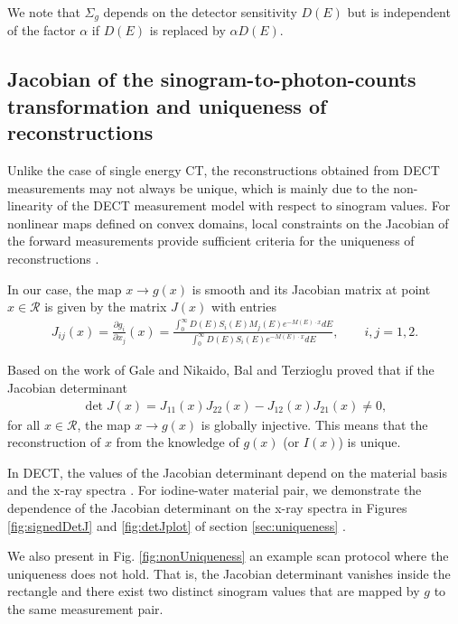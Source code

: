 \documentclass[12pt,twoside]{article}   %
\def\rR{\mathcal{R}}
\begin{document}
We note that $\Sigma_g$ depends on the detector sensitivity $D(E)$ but is independent of the factor $\alpha$ if $D(E)$ is replaced by $\alpha D(E)$.

\subsection{Jacobian of the sinogram-to-photon-counts transformation and uniqueness of reconstructions}\label{subsec:Jacobian}
 Unlike the case of single energy CT, the reconstructions obtained from DECT measurements may not always be unique, which is mainly due to the non-linearity of the DECT measurement model with respect to sinogram values. For nonlinear maps defined on convex domains, local constraints on the Jacobian of the forward measurements provide sufficient criteria for the uniqueness of reconstructions \cite{GaleNikaido, Garcia, MasColell}.
 
 In our case, the map $x\to g(x)$ is smooth and its Jacobian matrix at point $x\in \rR$ is given by the matrix $J(x)$ with entries
\begin{align}
  J_{ij}(x) = \frac{\partial g_i}{\partial x_j}(x) = \frac{\int_0^\infty D(E)S_i(E) M_j(E) e^{-M(E)\cdot x} dE}{\int_0^\infty D(E)S_i(E) e^{-M(E)\cdot x} dE} ,\qquad i,j =1,2.
\end{align}

 Based on the work of Gale and Nikaido\cite{GaleNikaido}, Bal and Terzioglu \cite{BalTer20} proved that if the Jacobian determinant 
\begin{align}\label{detJ}
\det J(x) = J_{11}(x)J_{22}(x)-J_{12}(x)J_{21}(x) \neq 0,
\end{align}
for all $x \in \rR$, the map $x\to g(x)$ is globally injective. This means that the reconstruction of $x$ from the knowledge of $g(x)$ (or $I(x)$) is unique. 

In DECT, the values of the Jacobian determinant depend on the material basis and the x-ray spectra \cite{BalTer20}. For iodine-water material pair, we demonstrate the dependence of the Jacobian determinant on the x-ray spectra in Figures \ref{fig:signedDetJ} and \ref{fig:detJplot} of section \ref{sec:uniqueness} .

We also present in Fig. \ref{fig:nonUniqueness} an example scan protocol where the uniqueness does not hold. That is, the Jacobian determinant vanishes inside the rectangle and there exist two distinct sinogram values that are mapped by $g$ to the same measurement pair.
\end{document}
